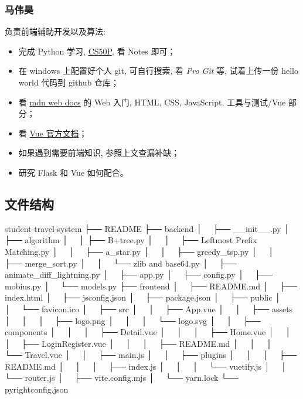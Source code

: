 \documentclass{ctexart}
\begin{document}
\subsubsection{马伟昊}
负责前端辅助开发以及算法:

\begin{itemize}
    \item 完成 Python 学习, \href{https://cs50.harvard.edu/python/2022/}{CS50P}, 看 Notes 即可；
    \item 在 windows 上配置好个人 git, 可自行搜索, 看 \textit{Pro Git} 等, 试着上传一份 hello world 代码到 github 仓库；
    \item 看 \href{https://developer.mozilla.org/zh-CN/docs/Learn/Getting_started_with_the_web}{mdn web docs} 的 Web 入门, HTML, CSS, JavaScript, 工具与测试/Vue 部分；
    \item 看 \href{https://cn.vuejs.org/guide/introduction.html}{Vue 官方文档}；
    \item 如果遇到需要前端知识, 参照上文查漏补缺；
    \item 研究 Flask 和 Vue 如何配合。
\end{itemize}

\subsection{文件结构}

\begin{bashcode}
    student-travel-system
    ├── README
    ├── backend
    │   ├── __init__.py
    │   ├── algorithm
    │   │   ├── B+tree.py
    │   │   ├── Leftmost Prefix Matching.py
    │   │   ├── a_star.py
    │   │   ├── greedy_tsp.py
    │   │   ├── merge_sort.py
    │   │   └── zlib and base64.py
    │   ├── animate_diff_lightning.py
    │   ├── app.py
    │   ├── config.py
    │   ├── mobius.py
    │   └── models.py
    ├── frontend
    │   ├── README.md
    │   ├── index.html
    │   ├── jsconfig.json
    │   ├── package.json
    │   ├── public
    │   │   └── favicon.ico
    │   ├── src
    │   │   ├── App.vue
    │   │   ├── assets
    │   │   │   ├── logo.png
    │   │   │   └── logo.svg
    │   │   ├── components
    │   │   │   ├── Detail.vue
    │   │   │   ├── Home.vue
    │   │   │   ├── LoginRegister.vue
    │   │   │   ├── README.md
    │   │   │   └── Travel.vue
    │   │   ├── main.js
    │   │   ├── plugins
    │   │   │   ├── README.md
    │   │   │   ├── index.js
    │   │   │   └── vuetify.js
    │   │   └── router.js
    │   ├── vite.config.mjs
    │   └── yarn.lock
    └── pyrightconfig.json
\end{bashcode}
\end{document}
